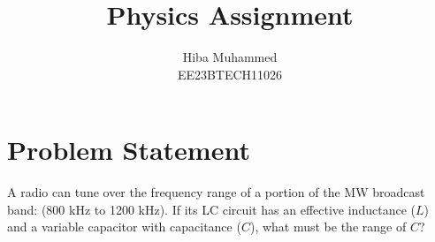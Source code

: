 \documentclass[12pt]{article}
\title{Physics Assignment}
\author{Hiba Muhammed \\
        EE23BTECH11026}
\begin{document}
    \maketitle

\section*{Problem Statement}
    A radio can tune over the frequency range of a portion of the MW broadcast band: (800 kHz to 1200 kHz). If its LC circuit has an effective inductance (\(L\)) and a variable capacitor with capacitance (\(C\)), what must be the range of \(C\)?
\end{document}
